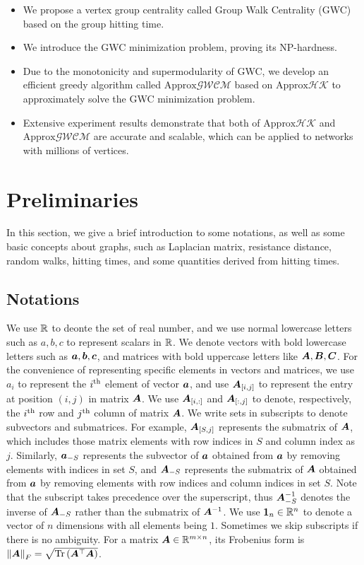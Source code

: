 \documentclass[10pt,twocolumn,twoside]{IEEEtran}
\begin{document}
\begin{itemize}
    \item We propose a vertex group centrality called Group Walk Centrality (GWC) based on the group hitting time.
    \item We introduce the GWC minimization problem, proving its NP-hardness.
    \item Due to the monotonicity and supermodularity of GWC, we develop an efficient greedy algorithm called \(\text{Approx}\mathcal{GWCM}\) based on \(\text{Approx}\mathcal{HK}\) to approximately solve the GWC minimization problem.
    \item Extensive experiment results demonstrate that both of \(\text{Approx}\mathcal{HK}\) and \(\text{Approx}\mathcal{GWCM}\) are accurate and scalable, which can be applied to networks with millions of vertices.
\end{itemize}


\section{Preliminaries}

In this section, we give a brief introduction to some notations, as well as some basic concepts about graphs, such as Laplacian matrix, resistance distance, random walks, hitting times, and some quantities derived from hitting times.

\subsection{Notations}

We use  \(\mathbb{R}\) to deonte the set of real number, and we use normal lowercase letters such as \(a,b,c\) to represent scalars in \(\mathbb{R}\). We denote vectors with bold lowercase letters such as \(\boldsymbol{a},\boldsymbol{b},\boldsymbol{c}\), and matrices with bold uppercase letters like \(\boldsymbol{A},\boldsymbol{B},\boldsymbol{C}\). For the convenience of representing specific elements in vectors and matrices, we use \(a_{i}\) to represent the \({i}^{\rm{th}}\) element of vector \(\boldsymbol{a}\), and use \(\boldsymbol{A}_{[i,j]}\) to represent the entry at position \((i,j)\) in matrix \(\boldsymbol{A}\). We use \(\boldsymbol{A}_{[i,:]}\) and \(\boldsymbol{A}_{[:,j]}\) to denote, respectively, the \({i}^{\rm{th}}\) row and \({j}^{\rm{th}}\) column of matrix \(\boldsymbol{A}\). We write sets in subscripts to denote subvectors and submatrices.
For example, \(\boldsymbol{A}_{[S,j]}\) represents the submatrix of \(\boldsymbol{A}\), which includes those matrix elements with row indices in \(S\) and column index as \(j\). Similarly, \(\boldsymbol{a}_{-S}\) represents the subvector of \(\boldsymbol{a}\) obtained from  \(\boldsymbol{a}\) by removing elements with indices in set \(S\), and \(\boldsymbol{A}_{-S}\) represents the submatrix of \(\boldsymbol{A}\) obtained  from  \(\boldsymbol{a}\) by removing elements with row indices and column indices in set \(S\).
Note that the subscript takes precedence over the superscript, thus \(\boldsymbol{A}_{-S}^{-1}\) denotes the inverse of \(\boldsymbol{A}_{-S}\) rather than the submatrix of \(\boldsymbol{A}^{-1}\). We use  \(\boldsymbol{1}_n\in \mathbb{R}^n\) to denote a vector of \(n\) dimensions with all elements being \(1\). Sometimes we skip subscripts if there is no ambiguity. For a matrix \(\boldsymbol{A}\in\mathbb{R}^{m\times n}\), its Frobenius form is \(\left\Vert\boldsymbol{A}\right\Vert_F=\sqrt{\mathrm{Tr}\left(\boldsymbol{A}^\top\boldsymbol{A}\right)}\).
\end{document}
